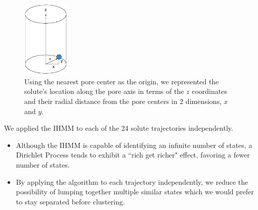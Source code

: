 \documentclass{article}
\begin{document}
  \begin{figure}
  \centering
  \includegraphics[width=0.2\textwidth]{cartesian_cylinder.pdf}
  \caption{Using the nearest pore center as the origin, we represented the solute's
  location along the pore axis in terms of the $z$ coordinates and their radial distance
  from the pore centers in 2 dimensions, $x$ and $y$.}\label{fig:cartesian_cylinder}
  \end{figure}
  
  We applied the IHMM to each of the 24 solute trajectories independently.
  \begin{itemize}
    \item Although the IHMM is capable of identifying an infinite number of states, 
    a Dirichlet Process tends to exhibit a ``rich get richer" effect, favoring
    a fewer number of states.
    \item By applying the algorithm to each trajectory independently, we reduce
    the possibility of lumping together multiple similar states which we
    would prefer to stay separated before clustering.
  \end{itemize}
  
\end{document}
